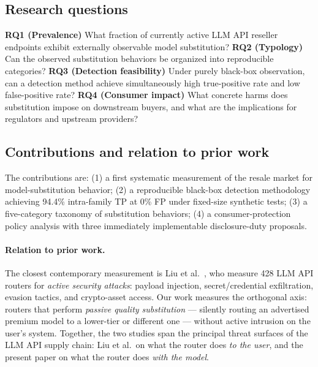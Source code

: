 \documentclass[10pt,a4paper,twocolumn]{article}
\begin{document}
\subsection{Research questions}
\textbf{RQ1 (Prevalence)} What fraction of currently active LLM API reseller
endpoints exhibit externally observable model substitution?
\textbf{RQ2 (Typology)} Can the observed substitution behaviors be organized
into reproducible categories?
\textbf{RQ3 (Detection feasibility)} Under purely black-box observation, can a
detection method achieve simultaneously high true-positive rate and low
false-positive rate?
\textbf{RQ4 (Consumer impact)} What concrete harms does substitution impose on
downstream buyers, and what are the implications for regulators and upstream
providers?

\subsection{Contributions and relation to prior work}
The contributions are: (1) a first systematic measurement of the resale market
for model-substitution behavior; (2) a reproducible black-box detection
methodology achieving 94.4\% intra-family TP at 0\% FP under fixed-size
synthetic tests; (3) a five-category taxonomy of substitution behaviors; (4) a
consumer-protection policy analysis with three immediately implementable
disclosure-duty proposals.

\paragraph{Relation to prior work.}
The closest contemporary measurement is Liu et al.~\cite{liu2026agent}, who
measure 428 LLM API routers for \emph{active security attacks}: payload
injection, secret/credential exfiltration, evasion tactics, and crypto-asset
access. Our work measures the orthogonal axis: routers that perform
\emph{passive quality substitution} --- silently routing an advertised premium
model to a lower-tier or different one --- without active intrusion on the user's
system. Together, the two studies span the principal threat surfaces of the
LLM API supply chain: Liu et al.\ on what the router does \emph{to the user},
and the present paper on what the router does \emph{with the model}.
\end{document}

